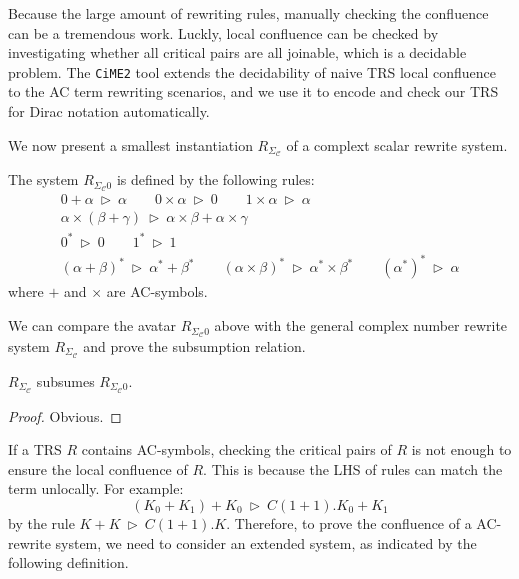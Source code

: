 \documentclass[manuscript, review, timestamp]{acmart}
\newcommand*{\reduce}{\ \triangleright\ }
\begin{document}
Because the large amount of rewriting rules, manually checking the confluence can be a tremendous work. Luckly, local confluence can be checked by investigating whether all critical pairs are all joinable, which is a decidable problem. The \texttt{CiME2}\cite{Contejean2011} tool extends the decidability of naive TRS local confluence to the AC term rewriting scenarios, and we use it to encode and check our TRS for Dirac notation automatically.

We now present a smallest instantiation $R_{\Sigma_\mathcal{C}}$ of a complext scalar rewrite system. 

\begin{definition}
  The system $R_{\Sigma_\mathcal{C}0}$ is defined by the following rules:
  \begin{gather*}
    0 + \alpha \reduce \alpha
    \qquad
    0 \times \alpha \reduce 0
    \qquad
    1 \times \alpha \reduce \alpha \\
    \alpha \times (\beta + \gamma) \reduce \alpha \times \beta + \alpha \times \gamma \\
    0^* \reduce 0
    \qquad
    1^* \reduce 1 \\
    (\alpha + \beta)^* \reduce \alpha^* + \beta^*
    \qquad
    (\alpha \times \beta)^* \reduce \alpha^* \times \beta^*
    \qquad
    (\alpha^*)^* \reduce \alpha
  \end{gather*}
  where $+$ and $\times$ are AC-symbols.
\end{definition}

We can compare the avatar $R_{\Sigma_\mathcal{C}0}$ above with the general complex number rewrite system $R_{\Sigma_\mathcal{C}}$ and prove the subsumption relation.

\begin{lemma}
  $R_{\Sigma_\mathcal{C}}$ subsumes $R_{\Sigma_\mathcal{C}0}$.
\end{lemma}

\begin{proof}
  Obvious.
\end{proof}


If a TRS $R$ contains AC-symbols, checking the critical pairs of $R$ is not enough to ensure the local confluence of $R$. This is because the LHS of rules can match the term unlocally. For example:
$$
(K_0 + K_1) + K_0 \reduce C(1 + 1).K_0 + K_1
$$
by the rule $ K + K \reduce C(1 + 1).K$. Therefore, to prove the confluence of a AC-rewrite system, we need to consider an extended system, as indicated by the following definition.
\end{document}
